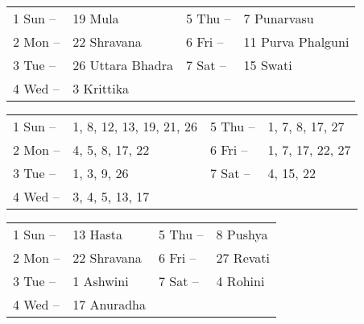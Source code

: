 \begin{center}
\begin{tabular}{ l l l l}                                                                                   

1 Sun     –       & 19 Mula                     & 5 Thu   –          & 7 Punarvasu                                \\

2 Mon    –       & 22 Shravana              & 6 Fri     –        & 11 Purva Phalguni                                \\

3 Tue     –       & 26 Uttara Bhadra        &7 Sat    –         &15 Swati                                \\

4 Wed    –          &3 Krittika &&                                 \\
   \end{tabular}
\end{center}
 


\begin{center}
\begin{tabular}{ l l l l}    
1 Sun     –        &1, 8, 12, 13, 19, 21, 26            &5 Thu   –         &1, 7, 8, 17, 27                                \\

2 Mon    –        &4, 5, 8, 17, 22                         & 6 Fri     –         &1, 7, 17, 22, 27                                \\

3 Tue     –        &1, 3, 9, 26                                &7 Sat    –        & 4, 15, 22                                \\

4 Wed    –        &3, 4, 5, 13, 17

    \end{tabular}
\end{center}

\begin{center}
\begin{tabular}{ l l l l}    
1 Sun     –        &13 Hasta                     & 5 Thu   –          & 8 Pushya                               \\

2 Mon    –       & 22 Shravana                & 6 Fri     –        & 27 Revati                               \\

3 Tue     –          &1 Ashwini                   &7 Sat    –           &4 Rohini                               \\

4 Wed    –       & 17 Anuradha
   \end{tabular}
\end{center}
 

